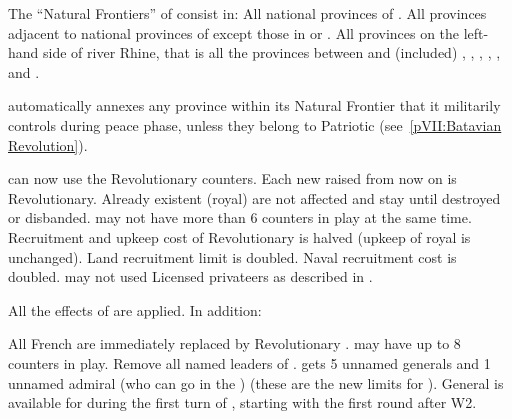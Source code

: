 \begin{digressions}

  \condition{}
  \aparag The ``Natural Frontiers'' of \FRA consist in:
  \bparag All national provinces of \FRA.
  \bparag All provinces adjacent to national provinces of \FRA except those in
  \HIS or \paysSuisse.
  \bparag All provinces on the left-hand side of river Rhine, that is all the
  provinces between \FRA and (included) \provinceAlsace, \provincePfalz,
  \provinceTrier, \provinceKoln, \provinceLimburg, \provinceUtrecht and
  \provinceZeeland.

  \phpaix
  \aparag \FRA automatically annexes any province within its Natural Frontier
  that it militarily controls during peace phase, unless they belong to
  Patriotic \HOL (see~\ref{pVII:Batavian Revolution}).



  \phadm
  \aparag \FRA can now use the Revolutionary \ARMY counters.
  \bparag Each new \ARMY raised from now on is Revolutionary.
  \bparag Already existent (royal) \ARMY are not affected and stay until
  destroyed or disbanded.
  \bparag \FRA may not have more than 6 \ARMY counters in play at the same
  time.
  \aparag Recruitment and upkeep cost of Revolutionary \ARMY is halved (upkeep
  of royal \ARMY is unchanged).
  \aparag Land recruitment limit is doubled.
  \aparag Naval recruitment cost is doubled.
  \aparag \FRA may not used Licensed privateers as described in
  .


  All the effects of  are applied. In
  addition:

  \phdipl
  \aparag All French \ARMY are immediately replaced by Revolutionary \ARMY.
  \aparag \FRA may have up to 8 \ARMY counters in play.
  \aparag Remove all named leaders of \FRA. \FRA gets 5 unnamed generals and 1
  unnamed admiral (who can go in the \ROTW) (these are the new limits for
  \FRA).
  \aparag General  is available for \FRA during the
  first turn of \monarqueTerror, starting with the first round after
  W2. %
\end{digressions}



